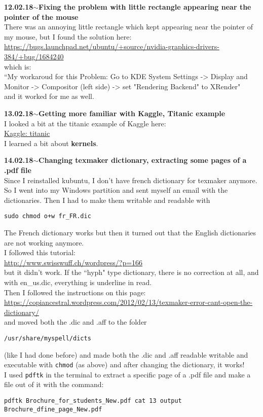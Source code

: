\documentclass[11pt,a4paper]{article}
\newenvironment{loggentry}[2]%
{\noindent\textbf{#1}\hspace{1cm}$\mathbf{\sim}$\text{ }\textbf{#2}\\}{\vspace{0.5cm}}
\begin{document}
\begin{loggentry}{12.02.18}{Fixing the problem with little rectangle appearing near the pointer of the mouse}
There was an annoying little rectangle which kept appearing near the pointer of my mouse, but I found the solution here:\\
\url{https://bugs.launchpad.net/ubuntu/+source/nvidia-graphics-drivers-384/+bug/1684240}\\
which is:\\
``My workaroud for this Problem: Go to KDE System Settings -> Display and Monitor -> Compositor (left side) -> set "Rendering Backend" to XRender"\\
and it worked for me as well.
\end{loggentry}

\begin{loggentry}{13.02.18}{Getting more familiar with Kaggle, Titanic example}
I looked a bit at the titanic example of Kaggle here:\\
\href{https://www.kaggle.com/c/titanic}{Kaggle: titanic}\\
I learned a bit about \textbf{kernels}.\\
\end{loggentry}

\begin{loggentry}{14.02.18}{Changing texmaker dictionary, extracting some pages of a .pdf file}
Since I reinstalled kubuntu, I don't have french dictionary for texmaker anymore. So I went into my Windows partition and sent myself an email with the dictionaries. Then I had to make them writable and readable with
\begin{verbatim}
sudo chmod o+w fr_FR.dic
\end{verbatim}
The French dictionary works but then it turned out that the English dictionaries are not working anymore.\\
I followed this tutorial:\\
\url{http://www.swisswuff.ch/wordpress/?p=166}\\
but it didn't work. If the ``hyph" type dictionary, there is no correction at all, and with en\_us.dic, everything is underline in read.\\
Then I followed the instructions on this page:\\
\url{https://copiancestral.wordpress.com/2012/02/13/texmaker-error-cant-open-the-dictionary/}\\
and moved both the .dic and .aff to the folder
\begin{verbatim}
/usr/share/myspell/dicts
\end{verbatim}
(like I had done before) and made both the .dic and .aff readable writable and executable with \texttt{chmod} (as above) and after changing the dictionary, it works!\\

I used \texttt{pdftk} in the terminal to extract a specific page of a .pdf file and make a file out of it with the command:\\
\begin{verbatim}
pdftk Brochure_for_students_New.pdf cat 13 output Brochure_dfine_page_New.pdf
\end{verbatim}
\end{loggentry}
\end{document}
